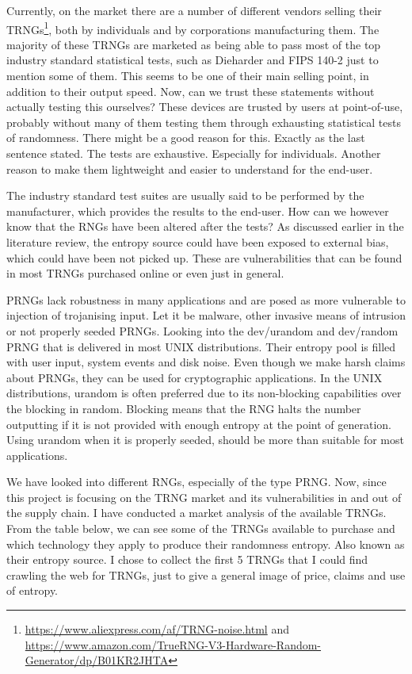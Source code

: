 \documentclass[]{final_report}
\begin{document}
\par{Currently, on the market there are a number of different vendors selling their TRNGs\footnote{\url{https://www.aliexpress.com/af/TRNG-noise.html} and \url{https://www.amazon.com/TrueRNG-V3-Hardware-Random-Generator/dp/B01KR2JHTA}}, both by individuals and by corporations manufacturing them. The majority of these TRNGs are marketed as being able to pass most of the top industry standard statistical tests, such as Dieharder and FIPS 140-2 just to mention some of them. This seems to be one of their main selling point, in addition to their output speed. Now, can we trust these statements without actually testing this ourselves? These devices are trusted by users at point-of-use, probably without many of them testing them through exhausting statistical tests of randomness. There might be a good reason for this. Exactly as the last sentence stated. The tests are exhaustive. Especially for individuals. Another reason to make them lightweight and easier to understand for the end-user.}

\par{The industry standard test suites are usually said to be performed by the manufacturer, which provides the results to the end-user. How can we however know that the RNGs have been altered after the tests? As discussed earlier in the literature review, the entropy source could have been exposed to external bias, which could have been not picked up. These are vulnerabilities that can be found in most TRNGs purchased online or even just in general.}

\par{PRNGs lack robustness in many applications and are posed as more vulnerable to injection of trojanising input. Let it be malware, other invasive means of intrusion or not properly seeded PRNGs. Looking into the dev/urandom and dev/random PRNG that is delivered in most UNIX distributions. Their entropy pool is filled with user input, system events and disk noise\cite{Vuillemin:2012}. Even though we make harsh claims about PRNGs, they can be used for cryptographic applications. In the UNIX distributions, urandom is often preferred\cite{Huhn:2014} due to its non-blocking capabilities over the blocking in random. Blocking means that the RNG halts the number outputting if it is not provided with enough entropy at the point of generation. Using urandom when it is properly seeded, should be more than suitable for most applications\cite{Huhn:2014}.}

\par{We have looked into different RNGs, especially of the type PRNG. Now, since this project is focusing on the TRNG market and its vulnerabilities in and out of the supply chain. I have conducted a market analysis of the available TRNGs. From the table below, we can see some of the TRNGs available to purchase and which technology they apply to produce their randomness entropy. Also known as their entropy source. I chose to collect the first 5 TRNGs that I could find crawling the web for TRNGs, just to give a general image of price, claims and use of entropy.}
\end{document}
